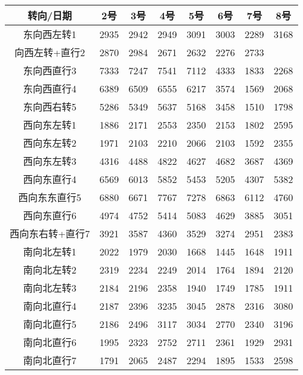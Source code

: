 \documentclass[UTF8]{article}
\begin{document}
    \begin{table}[h]
        \begin{tabular}{cccccccc}
            转向/日期 & 2号 & 3号 & 4号 & 5号 & 6号 & 7号 & 8号 \\
            \hline
            东向西左转1	& 2935	&2942	&2949	&3091	&3003	&2289	&3168\\
            \hline
            向西左转+直行2	&2870	&2984	&2671	&2632	&2276	&2733\\
            \hline
            东向西直行3	&7333	&7247	&7541	&7112	&4333	&1833	&2268\\
            \hline
            东向西直行4	&6389	&6509	&6555	&6217	&3574	&1569	&2068\\
            \hline
            东向西右转5	&5286	&5349	&5637	&5168	&3458	&1510	&1798\\
            \hline
            西向东左转1	&1886	&2171	&2553	&2350	&2153	&1802	&2595\\
            \hline
            西向东左转2	&1971	&2103	&2210	&2066	&2103	&1592	&2355\\
            \hline
            西向东左转3	&4316	&4488	&4822	&4627	&4682	&3687	&4369\\
            \hline
            西向东直行4	&6569	&6013	&5852	&5453	&5205	&4307	&5382\\
            \hline
            西向东东直行5	&6880	&6671	&7767	&7278	&6863	&6112	&4760\\
            \hline
            西向东直行6	&4974	&4752	&5414	&5083	&4629	&3885	&3051\\
            \hline
            西向东右转+直行7	&3921	&3587	&4360	&3529	&3274	&2951	&2383\\
            \hline
            南向北左转1	&2022	&1979	&2030	&1668	&1445	&1648	&1911\\
            \hline
            南向北左转2	&2319	&2234	&2249	&2014	&1764	&1894	&2120\\
            \hline
            南向北左转3	&2184	&2196	&2358	&1940	&1749	&1785	&1911\\
            \hline
            南向北直行4	&2187	&2396	&3235	&3045	&2878	&2316	&3080\\
            \hline
            南向北直行5	&2186	&2496	&3117	&3034	&2770	&2340	&3196\\
            \hline
            南向北直行6	&1995	&2323	&2752	&2711	&2361	&1929	&2931\\
            \hline
            南向北直行7	&1791	&2065	&2487	&2294	&1895	&1533	&2598\\

\end{tabular}
\end{table}
\end{document}
